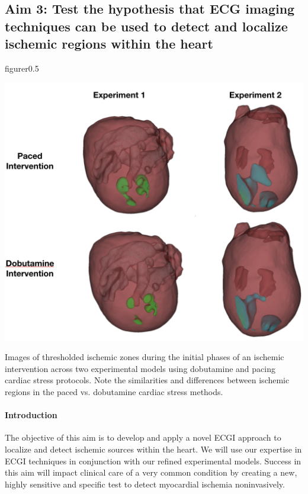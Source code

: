 \subsection{Aim 3: Test the hypothesis that ECG imaging techniques can be used to detect and localize ischemic regions within the heart}
\begin{wrapfloat}{figure}{r}{0.5\textwidth}
	\begin{center}
		{\includegraphics[width=.5\textwidth]
			{../Figures/DobutvsPacing.png}}
		\captionsetup{width = .5\textwidth}
		\caption{\small \label{fig:dobutPacingThreshold} Images of thresholded ischemic zones during the initial phases of an ischemic intervention across two experimental models using dobutamine and pacing cardiac stress protocols. Note the similarities and differences between ischemic regions in the paced vs. dobutamine cardiac stress methods. }
	\end{center}
\end{wrapfloat}
 \paragraph{Introduction} The objective of this aim is to develop and apply a novel ECGI approach to
localize and detect ischemic sources within the heart. We will use our
expertise in ECGI techniques in conjunction with our refined experimental
models. Success in this aim will impact clinical care of a very common
condition by creating a new, highly sensitive and specific test to detect
myocardial ischemia noninvasively.

